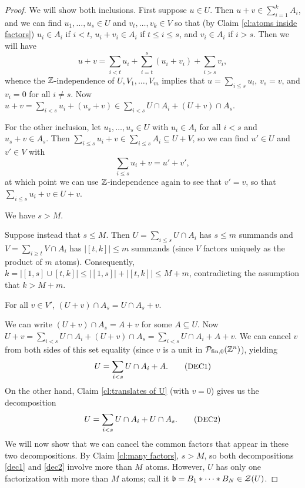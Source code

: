\begin{proof}
	
	We will show both inclusions.
	First suppose $u\in U$. 
	Then $u+v \in \sum_{i=1}^k A_i$, and we can find $u_1,\dots, u_s\in U$ and $v_t,\dots, v_k\in V$ so that (by Claim \ref{cl:atoms inside factors})
	$u_i\in A_i$ if $i < t$, $u_i + v_i \in A_i$ if $t\le i \le s$, and $v_i \in A_i$ if $i > s$.
	Then we will have
	\[u+v = \sum_{i<t} u_i + \sum_{i=t}^{s} (u_i+v_i) + \sum_{i > s} v_i, \]
	whence the $\mathbb{Z}$-independence of $U,V_1,\dots,V_m$ implies that $u = \sum_{i\le s} u_i$, $v_s = v$, and $v_i = 0$ for all $i\neq s$.
	Now $u+v = \sum_{i<s} u_i + (u_s+v)\in \sum_{i<s} U\cap A_i + (U+v)\cap A_s$.
	
	For the other inclusion, let $u_1,\dots, u_s\in U$ with $u_i\in A_i$ for all $i<s$ and $u_s + v\in A_s$.
	Then $\sum_{i\le s} u_i +v \in \sum_{i\le s} A_i \subseteq U+V$, so we can find $u'\in U$ and $v'\in V$ with 
	\[\sum_{i\le s}u_i + v = u' + v',\]
	at which point we can use $\mathbb{Z}$-independence again to see that $v' = v$, so that $\sum_{i\le s} u_i + v\in U+v$.
	
	\begin{claim} \label{cl:many factors}
	We have $s > M$. 
	\end{claim}
	
	
	Suppose instead that $s \le M$.
	Then $U = \sum_{i\le s} U\cap A_i$ has $s\le m$ summands and $V = \sum_{i\ge t} V\cap A_i$ has $|[t,k]| \le m$ summands (since $V$ factors uniquely as the product of $m$ atoms).
	Consequently, $k = |[1,s]\cup[t,k]| \le |[1,s]| + |[t,k]| \le M +m$, contradicting the assumption that $ k > M +m$.
	
	\begin{claim} \label{cl:translated intersection}
	For all $v\in V'$, $(U+v)\cap A_s = U\cap A_s + v$. \label{cld}
	\end{claim}
	
	We can write $(U+v)\cap A_s = A + v$ for some $A \subseteq U$.
	Now $U+v = \sum_{i<s} U\cap A_i + (U+v)\cap A_s = \sum_{i<s} U\cap A_i + A + v$.
	We can cancel $v$ from both sides of this set equality (since $v$ is a unit in $\mathcal{P}_{\textrm{fin}, 0}(\mathbb{Z}^n)$), yielding
	\[ U = \sum_{i<s} U\cap A_i + A. \tag*{({\small DEC1})} \label{dec1}\]
	On the other hand, Claim \ref{cl:translates of U} (with $v = 0$) gives us the decomposition
	\[ U = \sum_{i<s} U\cap A_i + U\cap A_s. \tag*{({\small DEC2})} \label{dec2}\]
	We will now show that we can cancel the common factors that appear in these two decompositions.
	By Claim \ref{cl:many factors}, $s>M$, so both decompositions \ref{dec1} and \ref{dec2} involve more than $M$ atoms.
	However, $U$ has only one factorization with more than $M$ atoms; call it $\mathfrak{b} = B_1*\cdots*B_N\in \mathcal{Z}(U)$.
	

\end{proof}
